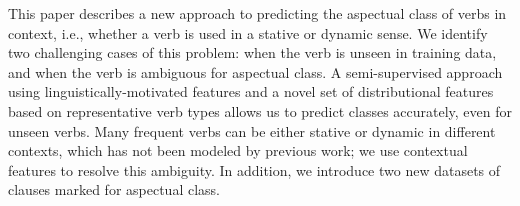 This paper describes a new approach to predicting the aspectual class of verbs in context, i.e., whether a verb is used in a stative or dynamic sense. We identify two challenging cases of this problem: when the verb is unseen in training data, and when the verb is ambiguous for aspectual class. A semi-supervised approach using linguistically-motivated features and a novel set of distributional features based on representative verb types allows us to predict classes accurately, even for unseen verbs. Many frequent verbs can be either stative or dynamic in different contexts, which has not been modeled by previous work; we use contextual features to resolve this ambiguity. In addition, we introduce two new datasets of clauses marked for aspectual class.
